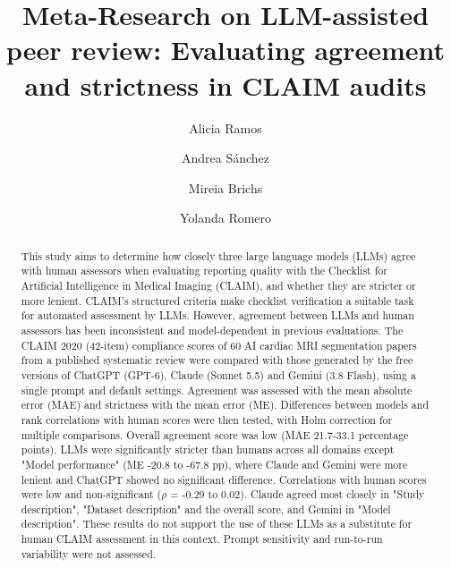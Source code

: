 \documentclass[runningheads]{llncs}
\begin{document}
%
\title{Meta-Research on LLM-assisted peer review: Evaluating agreement and strictness in CLAIM audits}
%
%
\author{Alicia Ramos\and Andrea Sánchez\and Mireia Brichs\and Yolanda Romero} 
%
%
%
\maketitle              %
%
\begin{abstract}
This study aims to determine how closely three large language models (LLMs) agree with human assessors when evaluating reporting quality with the Checklist for Artificial Intelligence in Medical Imaging (CLAIM), and whether they are stricter or more lenient. CLAIM's structured criteria make checklist verification a suitable task for automated assessment by LLMs. However, agreement between LLMs and human assessors has been inconsistent and model-dependent in previous evaluations. The CLAIM 2020 (42-item) compliance scores of 60 AI cardiac MRI segmentation papers from a published systematic review were compared with those generated by the free versions of ChatGPT (GPT-6), Claude (Sonnet 5.5) and Gemini (3.8 Flash), using a single prompt and default settings. Agreement was assessed with the mean absolute error (MAE) and strictness with the mean error (ME). Differences between models and rank correlations with human scores were then tested, with Holm correction for multiple comparisons. Overall agreement score was low (MAE 21.7-33.1 percentage points). LLMs were significantly stricter than humans across all domains except "Model performance" (ME -20.8 to -67.8 pp), where Claude and Gemini were more lenient and ChatGPT showed no significant difference. Correlations with human scores were low and non-significant ($\rho$ = -0.29 to 0.02). Claude agreed most closely in "Study description", "Dataset description" and the overall score, and Gemini in "Model description". These results do not support the use of these LLMs as a substitute for human CLAIM assessment in this context. Prompt sensitivity and run-to-run variability were not assessed.
\end{abstract}








%
%
%
% 
% 
%

\newpage



\newpage

\end{document}
